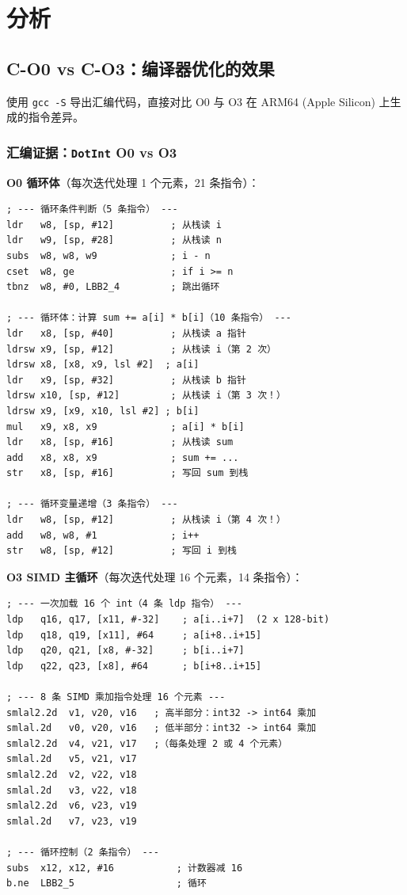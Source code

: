 \documentclass[12pt,a4paper]{article}
\begin{document}
\section{分析}

\subsection{C-O0 vs C-O3：编译器优化的效果}

使用 \texttt{gcc -S} 导出汇编代码，直接对比 O0 与 O3 在 ARM64 (Apple Silicon) 上生成的指令差异。

\subsubsection{汇编证据：\texttt{DotInt} O0 vs O3}

\textbf{O0 循环体}（每次迭代处理 1 个元素，21 条指令）：

\begin{lstlisting}
; --- 循环条件判断（5 条指令） ---
ldr   w8, [sp, #12]          ; 从栈读 i
ldr   w9, [sp, #28]          ; 从栈读 n
subs  w8, w8, w9             ; i - n
cset  w8, ge                 ; if i >= n
tbnz  w8, #0, LBB2_4         ; 跳出循环

; --- 循环体：计算 sum += a[i] * b[i]（10 条指令） ---
ldr   x8, [sp, #40]          ; 从栈读 a 指针
ldrsw x9, [sp, #12]          ; 从栈读 i（第 2 次）
ldrsw x8, [x8, x9, lsl #2]  ; a[i]
ldr   x9, [sp, #32]          ; 从栈读 b 指针
ldrsw x10, [sp, #12]         ; 从栈读 i（第 3 次！）
ldrsw x9, [x9, x10, lsl #2] ; b[i]
mul   x9, x8, x9             ; a[i] * b[i]
ldr   x8, [sp, #16]          ; 从栈读 sum
add   x8, x8, x9             ; sum += ...
str   x8, [sp, #16]          ; 写回 sum 到栈

; --- 循环变量递增（3 条指令） ---
ldr   w8, [sp, #12]          ; 从栈读 i（第 4 次！）
add   w8, w8, #1             ; i++
str   w8, [sp, #12]          ; 写回 i 到栈
\end{lstlisting}

\textbf{O3 SIMD 主循环}（每次迭代处理 16 个元素，14 条指令）：

\begin{lstlisting}
; --- 一次加载 16 个 int（4 条 ldp 指令） ---
ldp   q16, q17, [x11, #-32]    ; a[i..i+7]  (2 x 128-bit)
ldp   q18, q19, [x11], #64     ; a[i+8..i+15]
ldp   q20, q21, [x8, #-32]     ; b[i..i+7]
ldp   q22, q23, [x8], #64      ; b[i+8..i+15]

; --- 8 条 SIMD 乘加指令处理 16 个元素 ---
smlal2.2d  v1, v20, v16   ; 高半部分：int32 -> int64 乘加
smlal.2d   v0, v20, v16   ; 低半部分：int32 -> int64 乘加
smlal2.2d  v4, v21, v17   ;（每条处理 2 或 4 个元素）
smlal.2d   v5, v21, v17
smlal2.2d  v2, v22, v18
smlal.2d   v3, v22, v18
smlal2.2d  v6, v23, v19
smlal.2d   v7, v23, v19

; --- 循环控制（2 条指令） ---
subs  x12, x12, #16           ; 计数器减 16
b.ne  LBB2_5                  ; 循环
\end{lstlisting}
\end{document}
